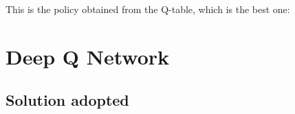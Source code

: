 \documentclass{article}
\begin{document}
This is the policy obtained from the Q-table, which is the best one:
\begin{center}
    \centering
\end{center}

\section{Deep Q Network}

\subsection{Solution adopted}
\end{document}
